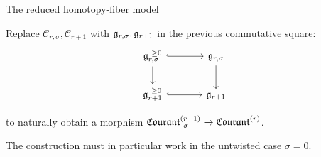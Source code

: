 \documentclass[beamer,10pt]{standalone}
\begin{document}
\begin{frame}{The reduced homotopy-fiber model}
	\begin{upshotblock}
	  Replace $\mathcal{C}_{r,\sigma}, \mathcal{C}_{r+1}$ with $\g_{r,\sigma}, \g_{r+1}$ in the previous commutative square:
		\begin{displaymath}
			\begin{tikzcd}[ampersand replacement=\&, column sep = large]
				\g_{r,\sigma}^{~\geq 0} \ar[r,hook] \ar[d, ]
				\& \g_{r,\sigma} \ar[d, ]
				\\
				\g_{r+1}^{~\geq 0} \ar[r,hook] \& \g_{r+1}
			\end{tikzcd}
		\end{displaymath}
		\medskip

		to naturally obtain a morphism $\Courant[\sigma]{r-1} \to \Courant{r}$.
	\end{upshotblock}
	\vfill

	The construction must in particular work in the untwisted case $\sigma=0$.
\end{frame}
\end{document}

